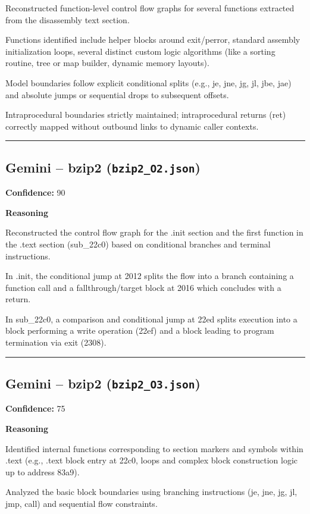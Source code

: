 Reconstructed function-level control flow graphs for several functions extracted from the disassembly text section.

Functions identified include helper blocks around exit/perror, standard assembly initialization loops, several distinct custom logic algorithms (like a sorting routine, tree or map builder, dynamic memory layouts).

Model boundaries follow explicit conditional splits (e.g., je, jne, jg, jl, jbe, jae) and absolute jumps or sequential drops to subsequent offsets.

Intraprocedural boundaries strictly maintained; intraprocedural returns (ret) correctly mapped without outbound links to dynamic caller contexts.

\bigskip
\hrule
\bigskip

\subsection{Gemini -- bzip2 (\texttt{bzip2\_O2.json})}

\textbf{Confidence:} 90

\textbf{Reasoning}

Reconstructed the control flow graph for the .init section and the first function in the .text section (sub\_22c0) based on conditional branches and terminal instructions.

In .init, the conditional jump at 2012 splits the flow into a branch containing a function call and a fallthrough/target block at 2016 which concludes with a return.

In sub\_22c0, a comparison and conditional jump at 22ed splits execution into a block performing a write operation (22ef) and a block leading to program termination via exit (2308).

\bigskip
\hrule
\bigskip

\subsection{Gemini -- bzip2 (\texttt{bzip2\_O3.json})}

\textbf{Confidence:} 75

\textbf{Reasoning}

Identified internal functions corresponding to section markers and symbols within .text (e.g., .text block entry at 22c0, loops and complex block construction logic up to address 83a9).

Analyzed the basic block boundaries using branching instructions (je, jne, jg, jl, jmp, call) and sequential flow constraints.

